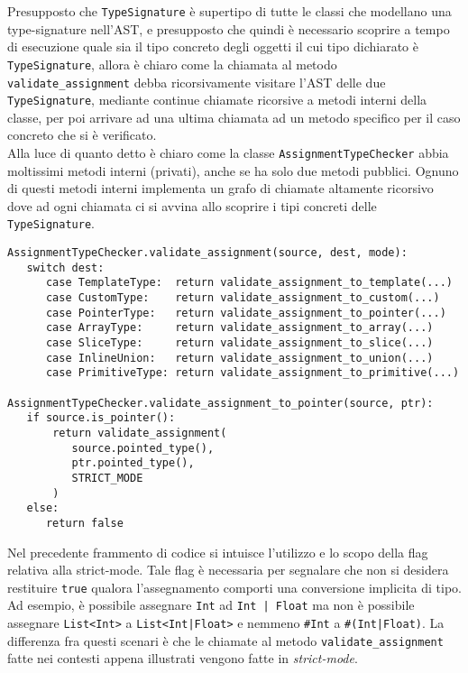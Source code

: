 \newpage

Presupposto che \texttt{TypeSignature} è supertipo di tutte le classi che modellano una type-signature nell'AST, e presupposto che 
quindi è necessario scoprire a tempo di esecuzione quale sia il tipo concreto degli oggetti il cui tipo dichiarato è \texttt{TypeSignature},
allora è chiaro come la chiamata al metodo \texttt{validate\_assignment} debba ricorsivamente visitare l'AST delle due \texttt{TypeSignature},
mediante continue chiamate ricorsive a metodi interni della classe, per poi arrivare ad una ultima chiamata ad un metodo specifico per 
il caso concreto che si è verificato. \\

Alla luce di quanto detto è chiaro come la classe \texttt{AssignmentTypeChecker} abbia moltissimi metodi interni (privati), anche se 
ha solo due metodi pubblici. Ognuno di questi metodi interni implementa un grafo di chiamate altamente ricorsivo dove ad ogni chiamata 
ci si avvina allo scoprire i tipi concreti delle \texttt{TypeSignature}. \\

\begin{lstlisting}[frame=single]
AssignmentTypeChecker.validate_assignment(source, dest, mode):
   switch dest:
      case TemplateType:  return validate_assignment_to_template(...)
      case CustomType:    return validate_assignment_to_custom(...)
      case PointerType:   return validate_assignment_to_pointer(...)
      case ArrayType:     return validate_assignment_to_array(...)
      case SliceType:     return validate_assignment_to_slice(...)
      case InlineUnion:   return validate_assignment_to_union(...)
      case PrimitiveType: return validate_assignment_to_primitive(...)

AssignmentTypeChecker.validate_assignment_to_pointer(source, ptr):
   if source.is_pointer():
       return validate_assignment(
          source.pointed_type(), 
          ptr.pointed_type(), 
          STRICT_MODE
       )
   else:
      return false
\end{lstlisting}
\vspace{0.5cm}

Nel precedente frammento di codice si intuisce l'utilizzo e lo scopo della flag relativa alla 
strict-mode. Tale flag è necessaria per segnalare che non si desidera restituire \texttt{true}
qualora l'assegnamento comporti una conversione implicita di tipo. \\

Ad esempio, è possibile assegnare \texttt{Int} ad \texttt{Int | Float} ma non è 
possibile assegnare \texttt{List<Int>} a \texttt{List<Int|Float>} e nemmeno 
\texttt{\#Int} a \texttt{\#(Int|Float)}. La differenza fra questi scenari è che le chiamate al 
metodo \texttt{validate\_assignment} fatte nei contesti appena illustrati vengono fatte in \textit{strict-mode}. \\


